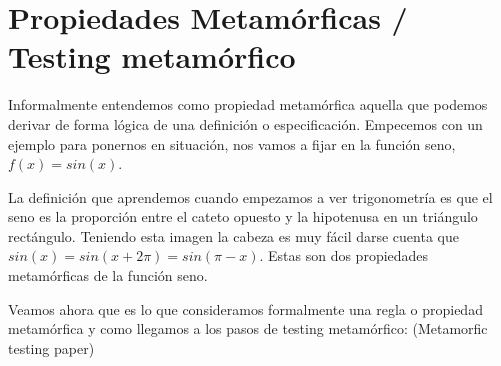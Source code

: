\vspace{10pt}

\section{Propiedades Metamórficas / Testing metamórfico}

Informalmente entendemos como propiedad metamórfica aquella que podemos derivar de forma lógica de una definición o especificación. Empecemos con un ejemplo para ponernos en situación, nos vamos a fijar en la función seno, $f(x)=sin(x)$.\newline

La definición que aprendemos cuando empezamos a ver trigonometría es que el seno es la proporción entre el cateto opuesto y la hipotenusa en un triángulo rectángulo. Teniendo esta imagen la cabeza es muy fácil darse cuenta que $sin(x)=sin(x + 2\pi)=sin(\pi-x)$. Estas son dos propiedades metamórficas de la función seno. \newline

Veamos ahora que es lo que consideramos formalmente una regla o propiedad metamórfica y como llegamos a los pasos de testing metamórfico: (Metamorfic testing paper)\newline

